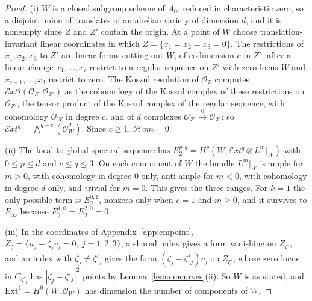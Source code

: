 \documentclass[11pt,reqno]{amsart}
\numberwithin{equation}{section}
\theoremstyle{plain}
\theoremstyle{definition}
\newcommand{\Ext}{\mathrm{Ext}}
\begin{document}
\begin{proof}
(i) $W$ is a closed subgroup scheme of $A_{0}$, reduced in characteristic zero, so a disjoint union of translates of an abelian variety of dimension $d$, and it is nonempty since $Z$ and $Z'$ contain the origin. At a point of $W$ choose translation-invariant linear coordinates in which $Z=\{x_{1}=x_{2}=x_{3}=0\}$. The restrictions of $x_{1},x_{2},x_{3}$ to $Z'$ are linear forms cutting out $W$, of codimension $c$ in $Z'$; after a linear change $x_{1},\dots,x_{c}$ restrict to a regular sequence on $Z'$ with zero locus $W$ and $x_{c+1},\dots,x_{3}$ restrict to zero. The Koszul resolution of $\mathcal{O}_{Z}$ computes $\mathcal{E}xt^{q}(\mathcal{O}_{Z},\mathcal{O}_{Z'})$ as the cohomology of the Koszul complex of these restrictions on $\mathcal{O}_{Z'}$, the tensor product of the Koszul complex of the regular sequence, with cohomology $\mathcal{O}_{W}$ in degree $c$, and of $d$ complexes $\mathcal{O}_{Z'}\xrightarrow{0}\mathcal{O}_{Z'}$; so $\mathcal{E}xt^{q}=\bigwedge^{q-c}(\mathcal{O}_{W}^{d})$. Since $c\ge1$, $\mathcal{H}om=0$.

(ii) The local-to-global spectral sequence has $E_{2}^{p,q}=H^{p}(W,\mathcal{E}xt^{q}\otimes L^{m}|_{W})$ with $0\le p\le d$ and $c\le q\le3$. On each component of $W$ the bundle $L^{m}|_{W}$ is ample for $m>0$, with cohomology in degree $0$ only, anti-ample for $m<0$, with cohomology in degree $d$ only, and trivial for $m=0$. This gives the three ranges. For $k=1$ the only possible term is $E_{2}^{0,1}$, nonzero only when $c=1$ and $m\ge0$, and it survives to $E_{\infty}$ because $E_{2}^{1,0}=E_{2}^{2,0}=0$.

(iii) In the coordinates of Appendix~\ref{app:cmpoint}, $Z_{\zeta}=\{u_{j}+\zeta_{j}v_{j}=0,\ j=1,2,3\}$; a shared index gives a form vanishing on $Z_{\zeta'}$, and an index with $\zeta_{j}\ne\zeta'_{j}$ gives the form $(\zeta_{j}-\zeta'_{j})v_{j}$ on $Z_{\zeta'}$, whose zero locus in $C_{\zeta'_{j}}$ has $|\zeta_{j}-\zeta'_{j}|^{2}$ points by Lemma~\ref{lem:cmcurves}(ii). So $W$ is as stated, and $\Ext^{1}=H^{0}(W,\mathcal{O}_{W})$ has dimension the number of components of $W$.
\end{proof}
\end{document}

